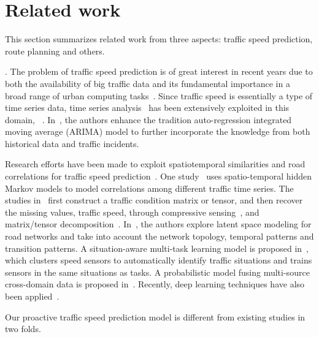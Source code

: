 \section{Related work}
\label{sec-related}

This section summarizes related work from three aspects: traffic speed prediction, route planning and others.

. The problem of traffic speed prediction is of great interest in recent years due to both the availability of big traffic data and its fundamental importance in a broad range of urban computing tasks~\cite{Zheng2014TIST}.
%
Since traffic speed is essentially a type of time series data, time series analysis~\cite{time-series-book} has been extensively exploited in this domain, \eg~\cite{traffic2011TRP,TS2012ICDM,HMM2013VLDB,MTL2017ICDM}. In~\cite{TS2012ICDM}, the authors enhance the tradition auto-regression integrated moving average (ARIMA) model to further incorporate the knowledge from both historical data and traffic incidents.

Research efforts have been made to exploit spatiotemporal similarities and road correlations for traffic speed prediction~\cite{Zhu2013TMC,Shang2014KDD,Wang2014KDD,LSM2016KDD,MTL2017ICDM,HMM2013VLDB}.
%
One study~\cite{HMM2013VLDB} uses spatio-temporal hidden Markov models to model correlations among different traffic time series.
%
The studies in~\cite{Zhu2013TMC,Shang2014KDD,Wang2014KDD} first construct a traffic condition matrix or tensor, and then recover the missing values, \ie traffic speed, through compressive sensing~\cite{Zhu2013TMC}, and matrix/tensor decomposition~\cite{Shang2014KDD,Wang2014KDD}.
%
In~\cite{LSM2016KDD}, the authors explore latent space modeling for road networks and take into account the network topology, temporal patterns and transition patterns.
%
A situation-aware multi-task learning model is proposed in~\cite{MTL2017ICDM}, which clusters speed sensors to automatically identify traffic situations and trains sensors in the same situations as tasks.
%
A probabilistic model fusing multi-source cross-domain data is proposed in~\cite{Lu2017Speed}.
Recently, deep learning techniques have also been applied~\cite{DL2016ICDM,DL2017SDM}. %

Our proactive traffic speed prediction model is different from existing studies in two folds.

